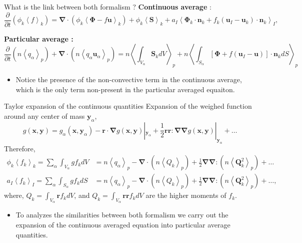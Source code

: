 \documentclass{sintefbeamer}
\newcommand{\kavg}[1]{\left<#1\right>_k}
\newcommand{\Iavg}[1]{\left<#1\right>_I}
\newcommand{\pavg}[1]{n \left<#1\right>_p}
\newcommand{\nablab}{\bm{\nabla}}
\newcommand{\pddt}{\frac{\partial}{\partial t}}
\begin{document}
\begin{frame}{What is the link between both formalism ?}
  \textbf{Continuous average} :
  \begin{equation*}
      \pddt (\phi_k\kavg{f})
      = \nablab \cdot \left(
          \phi_k \kavg{\bm{\Phi} - f \textbf{u}}
      \right)
      + \phi_k \kavg{\textbf{S}}
      + a_I \Iavg{
          \bm{\Phi}_k \cdot \textbf{n}_k
          + f_k 
          \left(
              \textbf{u}_I
              - \textbf{u}_k
          \right) \cdot \textbf{n}_k
      },
      \label{eq:avg_k_global}
  \end{equation*}

  \textbf{Particular average :}
  \begin{equation}
    \pddt   \left(\pavg{q_\alpha}\right)
    + \nablab \cdot \left(\pavg{q_\alpha \textbf{u}_\alpha}\right) 
    = \pavg{\int_{V_\alpha} \textbf{S}_k dV}
    + \pavg{\int_{S_\alpha} \left[\bm{\Phi} + f (\textbf{u}_I-\textbf{u}) \right] \cdot \textbf{n}_k d S}
    \label{eq:avg_p_global}
\end{equation}
\begin{itemize}
  \item 
  Notice the presence of the non-convective term in the continuous average, which is the only term non-present in the particular averaged equaiton. 
\end{itemize}
\end{frame}


\begin{frame}{Taylor expansion of the continuous quantities}
Expansion of the weighed function around any center of mass $\textbf{y}_\alpha$,
\begin{equation}
    g(\textbf{x},\textbf{y})
    = g_\alpha(\textbf{x},\textbf{y}_\alpha)
    - \textbf{r} \cdot \nablab g(\textbf{x},\textbf{y})|_{\textbf{y}_\alpha}
    + \frac{1}{2} \textbf{r}\textbf{r} : \nablab\nablab g(\textbf{x},\textbf{y})|_{\textbf{y}_\alpha}
    + \ldots
    \label{eq:g_exp}
\end{equation} 
Therefore,
\begin{align*}
  \phi_k \kavg{f_k} = \sum_\alpha \int_{V_\alpha} g f_k dV 
  &=  \pavg{q_\alpha}        
      - \nablab \cdot  \left
      (\pavg{Q_k}\right)        
      + \frac{1}{2} \nablab\nablab : \left(\pavg{\textbf{Q}_k^2}\right)
      + \ldots  \\
  a_I \Iavg{f_k} = \sum_\alpha \int_{S_\alpha} g f_k dS 
  &=  \pavg{q_\alpha}        
      - \nablab \cdot  \left(\pavg{Q_k}\right)        
      + \frac{1}{2} \nablab\nablab : \left(\pavg{\textbf{Q}_k^2}\right)
      + \ldots,
\end{align*}  
where, $Q_k = \int_{V_\alpha} \textbf{r} f_k dV$, and $Q_k = \int_{V_\alpha} \textbf{r} \textbf{r} f_k dV$  are the higher moments of $f_k$.
\begin{itemize}
  \item To analyzes the similarities between both formalism we carry out the expansion of the continuous averaged equation into particular average quantities. 
\end{itemize}
\end{frame}
\end{document}
